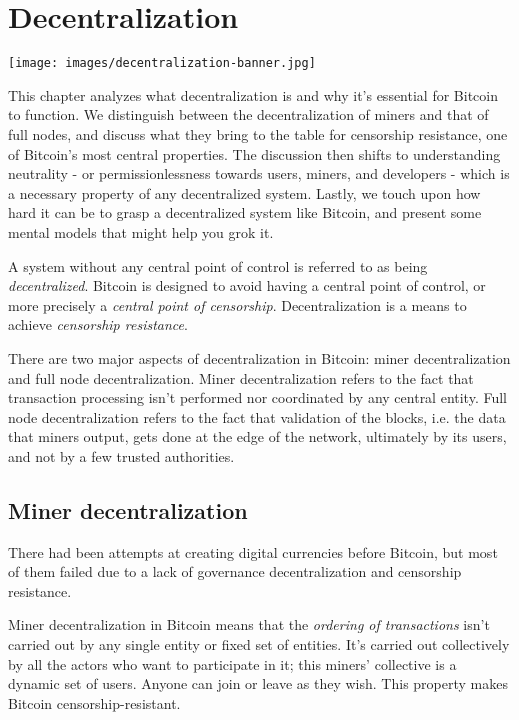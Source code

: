 \hypertarget{decentralization}{%
\section{Decentralization}\label{decentralization}}

\texttt{[image: images/decentralization-banner.jpg]}

This chapter analyzes what decentralization is and why it's essential
for Bitcoin to function. We distinguish between the decentralization of
miners and that of full nodes, and discuss what they bring to the table
for censorship resistance, one of Bitcoin's most central properties. The
discussion then shifts to understanding neutrality - or
permissionlessness towards users, miners, and developers - which is a
necessary property of any decentralized system. Lastly, we touch upon
how hard it can be to grasp a decentralized system like Bitcoin, and
present some mental models that might help you grok it.

A system without any central point of control is referred to as being
\emph{decentralized}. Bitcoin is designed to avoid having a central
point of control, or more precisely a \emph{central point of
censorship}. Decentralization is a means to achieve \emph{censorship
resistance}.

There are two major aspects of decentralization in Bitcoin: miner
decentralization and full node decentralization. Miner decentralization
refers to the fact that transaction processing isn't performed nor
coordinated by any central entity. Full node decentralization refers to
the fact that validation of the blocks, i.e. the data that miners
output, gets done at the edge of the network, ultimately by its users,
and not by a few trusted authorities.

\hypertarget{minerdecentralization}{%
\subsection{Miner decentralization}\label{minerdecentralization}}

There had been attempts at creating digital currencies before Bitcoin,
but most of them failed due to a lack of governance decentralization and
censorship resistance.

Miner decentralization in Bitcoin means that the \emph{ordering of
transactions} isn't carried out by any single entity or fixed set of
entities. It's carried out collectively by all the actors who want to
participate in it; this miners' collective is a dynamic set of users.
Anyone can join or leave as they wish. This property makes Bitcoin
censorship-resistant.

